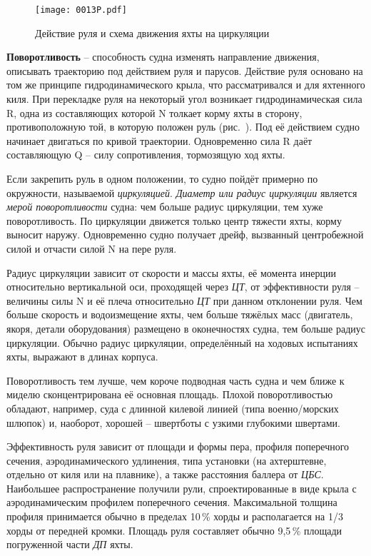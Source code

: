 \begin{figure*}[!htb]
  \centering
  \texttt{[image: 0013P.pdf]}
  \caption{Действие руля и схема движения яхты на циркуляции}
  \label{fig:13}
\end{figure*}

\textbf{Поворотливость} \--- способность судна
изменять направление движения, описывать траекторию под действием руля
и парусов. Действие руля основано на том же принципе
гидродинамического крыла, что рассматривался и для яхтенного киля. При
перекладке руля на некоторый угол возникает гидродинамическая сила \ve
R, одна из составляющих которой \ve N толкает корму яхты в сторону,
противоположную той, в которую положен руль (рис.~). Под её
действием судно начинает двигаться по кривой траектории. Одновременно
сила \ve R даёт составляющую \ve Q \--- силу сопротивления, тормозящую
ход яхты.

Если закрепить руль в одном положении, то судно пойдёт примерно по
окружности, называемой \textit{циркуляцией}.  \textit{Диаметр или
радиус циркуляции} является \textit{мерой
поворотливости}
судна: чем больше радиус циркуляции, тем хуже поворотливость. По
циркуляции движется только центр тяжести яхты, корму выносит
наружу. Одновременно судно получает дрейф, вызванный центробежной
силой и отчасти силой \ve N на пере руля.

Радиус циркуляции зависит от скорости и массы яхты, её момента инерции
относительно вертикальной оси, проходящей через \textit{ЦТ}, от
эффективности руля \--- величины силы \ve N и её плеча относительно
\textit{ЦТ} при данном отклонении руля. Чем больше скорость и
водоизмещение яхты, чем больше тяжёлых масс (двигатель, якоря, детали
оборудования) размещено в оконечностях судна, тем больше радиус
циркуляции. Обычно радиус циркуляции, определённый на ходовых
испытаниях яхты, выражают в длинах корпуса.

Поворотливость тем лучше, чем короче подводная часть судна и чем ближе
к миделю сконцентрирована её основная площадь. Плохой поворотливостью
обладают, например, суда с длинной килевой линией (типа
военно\-/морских шлюпок) и, наоборот, хорошей \--- швертботы с узкими
глубокими швертами.

Эффективность руля зависит от площади и формы пера, профиля
поперечного сечения, аэродинамического удлинения, типа установки (на
ахтерштевне, отдельно от киля или на плавнике), а также расстояния
баллера от \textit{ЦБС}. Наибольшее распространение получили рули,
спроектированные в виде крыла с аэродинамическим профилем поперечного
сечения. Максимальной толщина профиля принимается обычно в пределах
10\,\% хорды и располагается на 1/3 хорды от передней
кромки. Площадь руля составляет обычно 9,5\,\% площади
погруженной части \textit{ДП} яхты.

